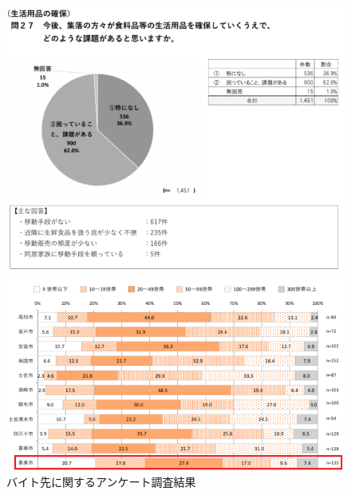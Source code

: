 \begin{figure}[h]
  \centering
  \begin{minipage}{0.43\columnwidth}
    \centering
    \includegraphics[width=\columnwidth]{get_food_graph.pdf}
  \end{minipage}
  \hspace{5mm}
  \begin{minipage}{0.43\columnwidth}
    \centering
    \includegraphics[width=\columnwidth]{市町村別世帯数別集落数の割合.pdf}
  \end{minipage}
  \caption{バイト先に関するアンケート調査結果}
  \label{fig:アンケート}
\end{figure}
